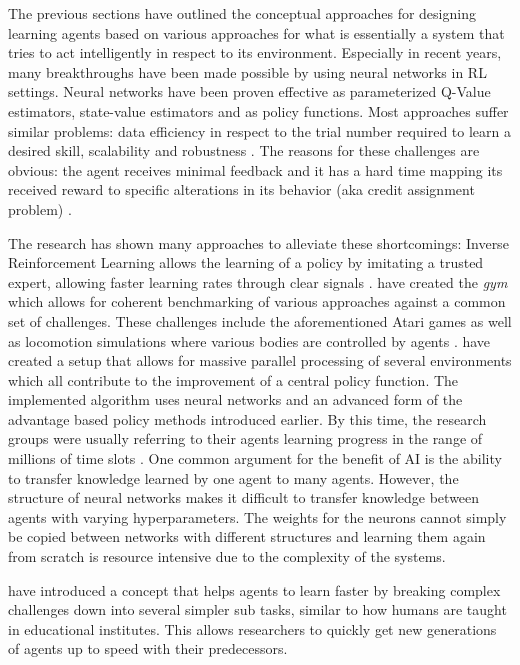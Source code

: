 The previous sections have outlined the conceptual approaches for designing learning agents based on various approaches
for what is essentially a system that tries to act intelligently in respect to its environment. Especially in recent
years, many breakthroughs have been made possible by using neural networks in \ac{RL} settings. Neural networks have
been proven effective as
parameterized Q-Value estimators, state-value estimators and as policy functions. Most approaches suffer similar
problems: data efficiency in respect to the trial number required to learn a desired skill, scalability and robustness
\citep{proximalpolicyopt}. The reasons for these challenges are obvious: the agent receives minimal feedback and it has
a hard time mapping its received reward to specific alterations in its behavior (aka credit assignment problem)
\citep{arulkumaran2017brief}.

The research has shown many approaches to alleviate these shortcomings: Inverse Reinforcement Learning allows the
learning of a policy by imitating a trusted expert, allowing faster learning rates through clear signals
\citep{NG2000InvReinf}. \citet{brockman2016openai} have created the \emph{gym} which allows for coherent benchmarking of
various approaches against a common set of challenges. These challenges include the aforementioned Atari games as well
as locomotion simulations where various bodies are controlled by agents \cite[]{heess2017emergence}.
\citet{hafner2017agents} have created a setup that allows for massive parallel processing of several environments which
all contribute to the improvement of a central policy function. The implemented algorithm uses neural networks and an
advanced form of the advantage based policy methods introduced earlier. By this time, the research groups were usually
referring to their agents learning progress in the range of millions of time slots \citep{proximalpolicyopt}. One common
argument for the benefit of \ac{AI} is the ability to transfer knowledge learned by one agent to many agents. However, the
structure of neural networks makes it difficult to transfer knowledge between agents with varying
hyperparameters. The weights for the neurons cannot simply be copied between networks with different structures and
learning them again from scratch is resource intensive due to the complexity of the systems.

\citet{matiisen2017teacher} have introduced a concept that helps agents to learn faster by breaking complex challenges down
into several simpler sub tasks, similar to how humans are taught in educational institutes. This allows researchers to
quickly get new generations of agents up to speed with their predecessors.


